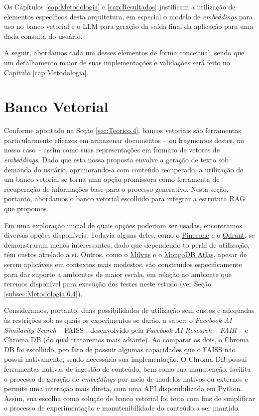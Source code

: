Os Capítulos \ref{cap:Metodologia} e \ref{cap:Resultados} justificam a utilização de elementos específicos desta arquitetura, em especial o modelo de \textit{embeddings} para uso no banco vetorial e o \ac{LLM} para geração da saída final da aplicação para uma dada consulta do usuário.

A seguir, abordamos cada um desses elementos de forma conceitual, sendo que um detalhamento maior de suas implementações e validações será feito no Capítulo \ref{cap:Metodologia}.


\section{Banco Vetorial}
\label{sec:Assistente.1}

Conforme apontado na Seção \ref{sec:Teorico.4}, bancos vetoriais são ferramentas particularmente eficazes em armazenar documentos -- ou fragmentos destes, no nosso caso -- assim como suas representações em formato de vetores de \textit{embeddings}. Dado que esta nossa proposta envolve a geração de texto sob demanda do usuário, aprimorando-a com conteúdo recuperado, a utilização de um banco vetorial se torna uma opção promissora como ferramenta de recuperação de informações base para o processo generativo. Nesta seção, portanto, abordamos o banco vetorial escolhido para integrar a estrutura \ac{RAG} que propomos.

Em uma exploração inicial de quais opções poderiam ser usadas, encontramos diversas opções disponíveis. Todavia alguns deles, como o \href{https://www.pinecone.io}{Pinecone} e o \href{https://qdrant.tech}{Qdrant}, se demonstraram menos interessantes, dado que dependendo to perfil de utilização, têm custos atrelado a si. Outros, como o \href{https://milvus.io/pt}{Milvus} e o \href{https://www.mongodb.com/products/platform/atlas-database}{MongoDB Atlas}, apesar de serem aplicáveis em contextos mais modestos, são construídos especificamente para dar suporte a ambientes de maior escala, em relação ao ambiente que teremos disponível para execução dos testes neste estudo (ver Seção \ref{subsec:Metodologia.6.4}).

Consideramos, portanto, duas possibilidades de utilização sem custos e adequadas às restrições sob as quais os experimentos se darão, a saber: o \textit{Facebook AI Similarity Search} -- FAISS \cite{FAISS:1}, desenvolvido pela \textit{Facebook AI Research} -- \textit{FAIR} -- e Chroma DB (do qual trataremos mais adiante). Ao comparar os dois, o Chroma DB foi escolhido, peo fato de possuir algumas capacidades que o FAISS não possui nativamente, sendo necessária sua implementação. O Chroma DB possui ferramentas nativas de ingestão de conteúdo, bem como sua manutenção, facilita o processo de geração de \textit{embeddings} por meio de modelos nativos ou externos e permite uma interação mais direta, com uma API disponibilizada em Python. Assim, sua escolha como solução de banco vetorial foi teita com fins de simplificar o processo de experimentação e manutenibilidade do conteúdo a ser mantido.

